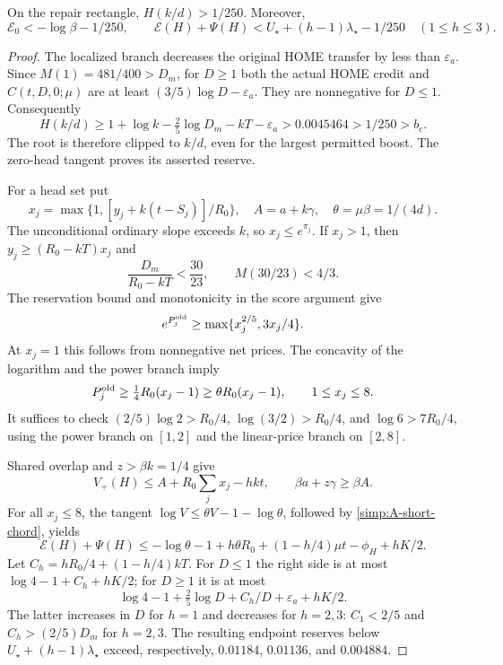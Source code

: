 \begin{lemma}\label{scalar:A-low}
On the repair rectangle, $H(k/d)>1/250$.  Moreover,
\[
 \mathcal E_0<-\log\beta-1/250,
 \qquad
 \mathcal E(H)+\Psi(H)
 <U_\star+(h-1)\lambda_\star-1/250\quad(1\le h\le3).
\]
\end{lemma}
\begin{proof}
The localized branch decreases the original HOME transfer by less than
$\varepsilon_a$.  Since $M(1)=481/400>D_m$, for $D\ge1$ both the
actual HOME credit and $C(t,D,0;\mu)$ are at least
$(3/5)\log D-\varepsilon_a$.  They are nonnegative for $D\le1$.
Consequently
\[
 H(k/d)\ge1+\log k-\tfrac25\log D_m-kT-\varepsilon_a
 >0.0045464>1/250>b_c.
\]
The root is therefore clipped to $k/d$, even for the largest permitted
boost.  The zero-head tangent proves its asserted reserve.

For a head set put
\[
 x_j=\max\{1,[y_j+k(t-S_j)]/R_0\},\quad
 A=a+k\gamma,\quad\theta=\mu\beta=1/(4d).
\]
The unconditional ordinary slope exceeds $k$, so $x_j\le e^{\pi_j}$.
If $x_j>1$, then
$y_j\ge(R_0-kT)x_j$ and
\[
 \frac{D_m}{R_0-kT}<\frac{30}{23},\qquad M(30/23)<4/3.
\]
The reservation bound and monotonicity in the score argument give
\begin{equation}\label{simp:A-owner}
 e^{P_j^{\rm old}}\ge\max\{x_j^{2/5},3x_j/4\}.
\end{equation}
At $x_j=1$ this follows from nonnegative net prices.  The concavity of
the logarithm and the power branch imply
\begin{equation}\label{simp:A-short-chord}
 P_j^{\rm old}\ge\tfrac14R_0(x_j-1)
                  \ge\theta R_0(x_j-1),\qquad 1\le x_j\le8.
\end{equation}
It suffices to check
$(2/5)\log2>R_0/4$, $\log(3/2)>R_0/4$, and
$\log6>7R_0/4$, using the power branch on $[1,2]$ and the
linear-price branch on $[2,8]$.

Shared overlap and $z>\beta k=1/4$ give
\[
 V_+(H)\le A+R_0\sum_jx_j-hkt,
 \qquad \beta a+z\gamma\ge\beta A.
\]
For all $x_j\le8$, the tangent
$\log V\le\theta V-1-\log\theta$, followed by
\eqref{simp:A-short-chord}, yields
\begin{equation}\label{simp:A-low-bound}
 \mathcal E(H)+\Psi(H)
 \le-\log\theta-1+h\theta R_0
       +(1-h/4)\mu t-\phi_H+hK/2.
\end{equation}
Let $C_h=hR_0/4+(1-h/4)kT$.
For $D\le1$ the right side is at most
$\log4-1+C_h+hK/2$; for $D\ge1$ it is at most
\[
 \log4-1+\tfrac25\log D+C_h/D+\varepsilon_a+hK/2.
\]
The latter increases in $D$ for $h=1$ and decreases for $h=2,3$:
$C_1<2/5$ and $C_h>(2/5)D_m$ for $h=2,3$.
The resulting endpoint reserves below
$U_\star+(h-1)\lambda_\star$ exceed, respectively,
$0.01184$, $0.01136$, and $0.004884$.


\end{proof}
